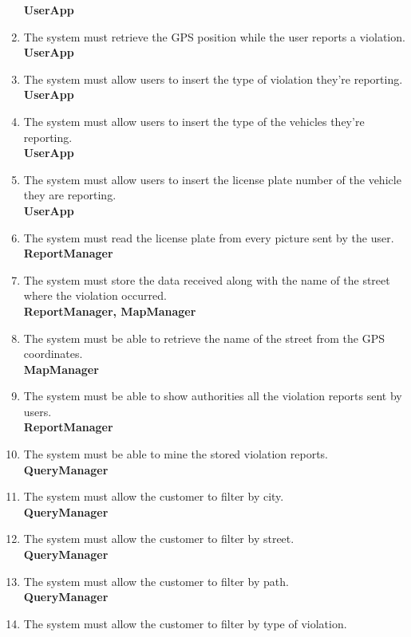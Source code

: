\begin{enumerate}[label=\textbf{R\arabic*}]
		\textbf{UserApp}
		\item \label{req:gpsPosition} The system must retrieve the GPS position while the user reports a violation.\\
		\textbf{UserApp}
		\item \label{req:violationType} The system must allow users to insert the type of violation they’re reporting.\\
		\textbf{UserApp}
		\item \label{req:vehicleType} The system must allow users to insert the type of the vehicles they’re reporting.\\
		\textbf{UserApp}
		\item \label{req:plateNumber} The system must allow users to insert the license plate number of the vehicle they are reporting.\\
		\textbf{UserApp}
		\item \label{req:readPlate} The system must read the license plate from every picture sent by the user.\\
		\textbf{ReportManager}
		\item \label{req:storeViolation} The system must store the data received along with the name of the street where the violation occurred.\\
		\textbf{ReportManager, MapManager}
		\item \label{req:streetName} The system must be able to retrieve the name of the street from the GPS coordinates.\\
		\textbf{MapManager}
		\item \label{req:notifyAuthority} The system must be able to show authorities all the violation reports sent by users.\\
		\textbf{ReportManager}
		\item \label{req:mineData} The system must be able to mine the stored violation reports.\\
		\textbf{QueryManager}
		\item \label{req:cityFilter} The system must allow the customer to filter by city.\\
		\textbf{QueryManager}
		\item \label{req:streetFilter} The system must allow the customer to filter by street.\\
		\textbf{QueryManager}
		\item \label{req:pathFilter} The system must allow the customer to filter by path.\\
		\textbf{QueryManager}
		\item \label{req:violationFilter} The system must allow the customer to filter by type of violation.\\

\end{enumerate}
